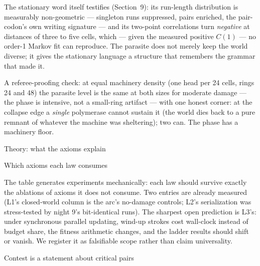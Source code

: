 The stationary word itself testifies (Section~9): its run-length
distribution is measurably non-geometric --- singleton runs
suppressed, pairs enriched, the pair-codon's own writing signature
--- and its two-point correlations turn {\it negative} at
distances of three to five cells, which --- given the measured
positive $C(1)$ --- no order-1 Markov fit can reproduce. The parasite does not merely keep the world diverse; it
gives the stationary language a structure that remembers the
grammar that made it.

A referee-proofing check: at equal machinery density (one head per
24 cells, rings 24 and 48) the parasite level is the same at both
sizes for moderate damage --- the phase is intensive, not a
small-ring artifact --- with one honest corner: at the collapse
edge a {\it single} polymerase cannot sustain it (the world dies
back to a pure remnant of whatever the machine was sheltering);
two can. The phase has a machinery floor.

\sec Theory: what the axioms explain

\secc Which axioms each law consumes

\medskip
\noindent{}
\medskip

\noindent The table generates experiments mechanically: each law
should survive exactly the ablations of axioms it does not
consume. Two entries are already measured (L1's closed-world
column is the arc's no-damage controls; L2's serialization was
stress-tested by night 9's bit-identical runs). The sharpest open
prediction is L3's: under synchronous parallel updating,
wind-up strokes cost wall-clock instead of budget share, the
fitness arithmetic changes, and the ladder results should shift or
vanish. We register it as falsifiable scope
rather than claim universality.

\secc Contest is a statement about critical pairs

